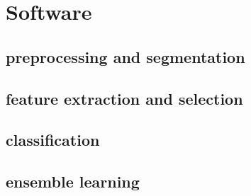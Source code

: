 \section{Software}

\subsection{preprocessing and segmentation}

\subsection{feature extraction and selection}

\subsection{classification}

\subsection{ensemble learning}

